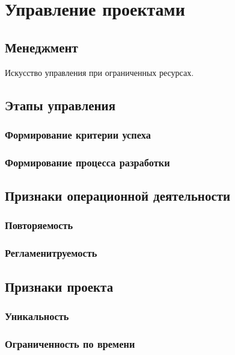 \chapter{Управление проектами}

\section{Менеджмент}
Искусство управления при ограниченных ресурсах.

\section{Этапы управления}

\subsection{Формирование критерии успеха}
\subsection{Формирование процесса разработки}

\section{Признаки операционной деятельности}

\subsection{Повторяемость}
\subsection{Регламенитруемость}

\section{Признаки проекта}

\subsection{Уникальность}
\subsection{Ограниченность по времени}

